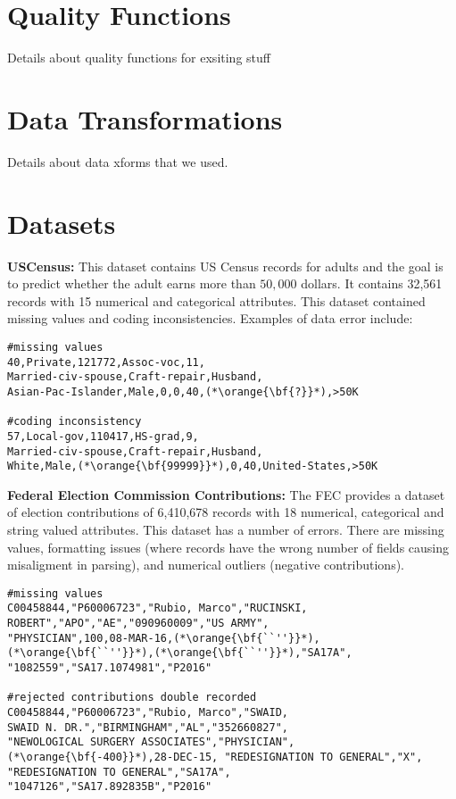 \appendix
\label{s:appendix}

\section{Quality Functions}
Details about quality functions for exsiting stuff

\section{Data Transformations}

Details about data xforms that we used.

\section{Datasets}
\vspace{0.5em}\noindent\textbf{USCensus: } This dataset contains US Census records for adults and the goal is to predict  whether the adult earns more than $50,000$ dollars. It contains 32,561 records with 15 numerical and categorical attributes. This dataset contained missing values and coding inconsistencies.
Examples of data error include:
\begin{lstlisting}
#missing values
40,Private,121772,Assoc-voc,11,
Married-civ-spouse,Craft-repair,Husband, 
Asian-Pac-Islander,Male,0,0,40,(*\orange{\bf{?}}*),>50K

#coding inconsistency
57,Local-gov,110417,HS-grad,9,
Married-civ-spouse,Craft-repair,Husband,
White,Male,(*\orange{\bf{99999}}*),0,40,United-States,>50K
\end{lstlisting}


\vspace{0.5em}\noindent\textbf{Federal Election Commission Contributions: } The FEC provides a dataset of election contributions of 6,410,678 records with 18 numerical, categorical and string valued attributes. This dataset has a number of errors. There are missing values, formatting issues (where records have the wrong number of fields causing misaligment in parsing), and numerical outliers (negative contributions).

\begin{lstlisting}
#missing values
C00458844,"P60006723","Rubio, Marco","RUCINSKI,
ROBERT","APO","AE","090960009","US ARMY",
"PHYSICIAN",100,08-MAR-16,(*\orange{\bf{``''}}*),(*\orange{\bf{``''}}*),(*\orange{\bf{``''}}*),"SA17A",
"1082559","SA17.1074981","P2016"

#rejected contributions double recorded
C00458844,"P60006723","Rubio, Marco","SWAID, 
SWAID N. DR.","BIRMINGHAM","AL","352660827",
"NEWOLOGICAL SURGERY ASSOCIATES","PHYSICIAN",
(*\orange{\bf{-400}}*),28-DEC-15, "REDESIGNATION TO GENERAL","X",
"REDESIGNATION TO GENERAL","SA17A",
"1047126","SA17.892835B","P2016"
\end{lstlisting}
